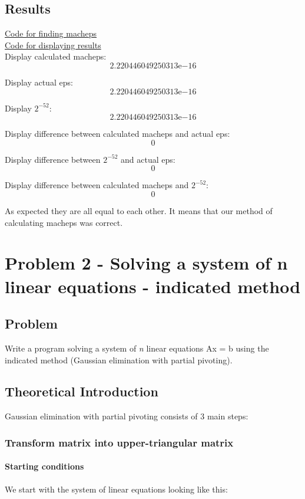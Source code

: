 \documentclass[12pt]{report}
\begin{document}
\section{Results}
\hyperlink{function1_macheps}{Code for finding macheps}\\
\hyperlink{function1_display}{Code for displaying results}\\
Display calculated macheps:
     \[2.220446049250313\mathrm{e}{-16}\]

Display actual eps:
     \[2.220446049250313\mathrm{e}{-16}\]

Display $2^{-52}$:
     \[2.220446049250313\mathrm{e}{-16}\]

Display difference between calculated macheps and actual eps:
     \[0\]

Display difference between $2^{-52}$ and actual eps:
          \[0\]

Display difference between calculated macheps and $2^{-52}$:
         \[0\]

As expected they are all equal to each other. It means that our method of calculating macheps was correct.

\chapter{Problem 2 - Solving a system of n linear equations - indicated method}

\section{Problem}
Write a program solving a system of \textit{n} linear equations Ax = b using the indicated method (Gaussian elimination with partial pivoting).

\section{Theoretical Introduction}
Gaussian elimination with partial pivoting consists of 3 main steps:
\subsection{Transform matrix into upper-triangular matrix}

\subsubsection{Starting conditions}
We start with the system of linear equations looking like this:
\end{document}
